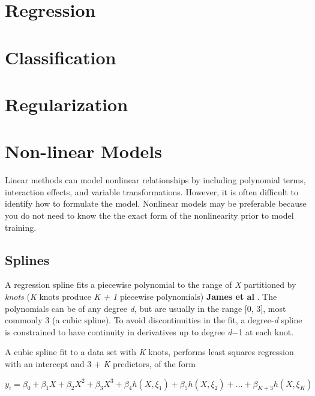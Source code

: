 \documentclass[]{book}
\begin{document}
\hypertarget{regression}{%
\chapter{Regression}\label{regression}}

\hypertarget{classification}{%
\chapter{Classification}\label{classification}}

\hypertarget{regularization}{%
\chapter{Regularization}\label{regularization}}

\hypertarget{non-linear-models}{%
\chapter{Non-linear Models}\label{non-linear-models}}

Linear methods can model nonlinear relationships by including polynomial terms, interaction effects, and variable transformations. However, it is often difficult to identify how to formulate the model. Nonlinear models may be preferable because you do not need to know the the exact form of the nonlinearity prior to model training.

\hypertarget{splines}{%
\section{Splines}\label{splines}}

A regression spline fits a piecewise polynomial to the range of \emph{X} partitioned by \emph{knots} (\emph{K} knots produce \emph{K + 1} piecewise polynomials) \textbf{James et al} \citep{James2013}. The polynomials can be of any degree \emph{d}, but are usually in the range {[}0, 3{]}, most commonly 3 (a cubic spline). To avoid discontinuities in the fit, a degree-\emph{d} spline is constrained to have continuity in derivatives up to degree \emph{d}−1 at each knot.

A cubic spline fit to a data set with \emph{K} knots, performs least squares regression with an intercept and 3 + \emph{K} predictors, of the form

\[y_i = \beta_0 + \beta_1X + \beta_2X^2 + \beta_3X^3 + \beta_4h(X, \xi_1) + \beta_5h(X, \xi_2) + \dots + \beta_{K+3}h(X, \xi_K)\]
\end{document}
